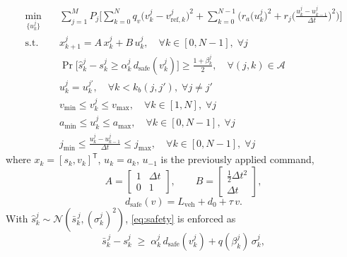 \documentclass[letterpaper, 10 pt, journal]{IEEEtran}
\begin{document}
\begin{subequations} \label{eq:mpc_problem}
\begin{align}
    \min_{\{u^j_k\}} \quad
    & \sum_{j=1}^{M} P_j
      \Bigg[
        \sum_{k=0}^{N} q_v \big(v^j_k - v^j_{\mathrm{ref},k}\big)^2
        + \sum_{k=0}^{N-1} \bigg(
            r_a \big(u^j_k\big)^2
            + r_j \bigg(\frac{u^j_k - u^j_{k-1}}{\Delta t}\bigg)^2
          \bigg)
      \Bigg]
      \label{eq:cost} \\
    \textrm{s.t.} \quad
    & x^j_{k+1} = A\,x^j_k + B\,u^j_k,
      \quad \forall k \in [0, N-1],\; \forall j
      \label{eq:dynamics} \\
    & \Pr\!\Big[\hat s^j_k - s^j_k \ge \alpha^j_k\, d_{\mathrm{safe}}(v^j_k)\Big]
      \ge \frac{1+\beta^j_k}{2},
      \quad \forall (j,k) \in \mathcal{A}
      \label{eq:safety} \\
    & u^j_k = u^{j'}_k,
      \quad \forall k < k_b(j,j'), \;
      \forall j \neq j'
      \label{eq:branch_nac} \\
    & v_{\min} \le v^j_k \le v_{\max},
      \quad \forall k \in [1, N], \; \forall j
      \label{eq:state_bound} \\
    & a_{\min} \le u^j_k \le a_{\max},
      \quad \forall k \in [0, N-1], \; \forall j
      \label{eq:input_bound} \\
    & j_{\min} \le \frac{u^j_k - u^j_{k-1}}{\Delta t} \le j_{\max},
      \quad \forall k \in [0, N-1], \; \forall j
      \label{eq:jerk_bound}
\end{align}
\end{subequations}
where $x_k = [s_k, v_k]^\mathsf{T}$, $u_k = a_k$, $u_{-1}$ is the previously applied command,
\begin{equation}
    A = \begin{bmatrix} 1 & \Delta t \\ 0 & 1 \end{bmatrix}, \qquad
    B = \begin{bmatrix} \tfrac{1}{2}\Delta t^2 \\ \Delta t \end{bmatrix},
    \label{eq:ab}
\end{equation}
\begin{equation}
    d_{\mathrm{safe}}(v) = L_{\mathrm{veh}} + d_0 + \tau\, v .
    \label{eq:dsafe}
\end{equation}
With $\hat s^j_k \sim \mathcal{N}(\bar s^{\,j}_k, (\sigma^j_k)^2)$, \eqref{eq:safety} is enforced as
\begin{equation}
    \bar s^{\,j}_k - s^j_k \;\ge\; \alpha^j_k\, d_{\mathrm{safe}}(v^j_k) + q(\beta^j_k)\,\sigma^j_k,
    \label{eq:safety_det}
\end{equation}
\end{document}
